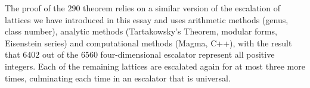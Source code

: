 The proof of the \(290\) theorem relies on a similar version of the
escalation of lattices we have introduced in this essay and uses arithmetic
methods (genus, class number), analytic methods (Tartakowsky's Theorem, modular
forms, Eisenstein series) and computational methods (Magma, C++), with the
result that \(6402\) out of the \(6560\) four-dimensional escalator represent
all positive integers. Each of the remaining lattices are escalated again for at
most three more times, culminating each time in an escalator that is universal.